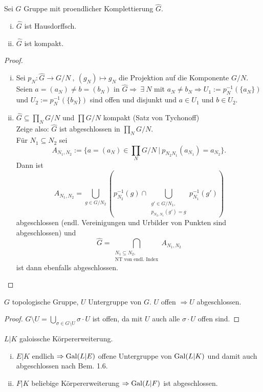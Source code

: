 \begin{Prop}
Sei $G$ Gruppe mit proendlicher Komplettierung $\hat{G}$.
\begin{enumerate}[(i)]
\item $\hat{G}$ ist Hausdorffsch.
\item $\hat{G}$ ist kompakt.
\end{enumerate}
\end{Prop}

\begin{proof}
\begin{enumerate}[i)]
\item Sei $p_N : \hat{G} \to G/N \ , \ (g_N) \mapsto g_N$ die Projektion auf die Komponente $G/N$.\\
Seien $a=(a_N) \neq b = (b_N)$ in $\hat{G} \Rightarrow \ \exists \ N$ mit $a_N \neq b_N \Rightarrow U_1:= p_N^{-1}(\{a_N\})$ und $U_2:=p_N^{-1}(\{b_N\})$ sind offen und disjunkt und $a \in U_1$ und $b \in U_2$.
\item $\hat{G} \subseteq \prod_N G/N$ und $\prod G/N$ kompakt (Satz von Tychonoff)\\
Zeige also: $\hat{G}$ ist abgeschlossen in $\prod_N G/N$.\\
Für $N_1 \subseteq N_2$ sei
\[A_{N_1, N_2} :=\{a=(a_N) \in \prod_N G/N \ | \ p_{N_2 N_1}(a_{N_1})=a_{N_2}\}.\]
Dann ist 
\[A_{N_1, N_2} = \bigcup \limits_{g \in G/N_2} (p_{N_2}^{-1}(g) \cap \bigcup \limits_{\substack{g' \in G/N_1,\\ p_{N_2, N_1}(g')=g}} p^{-1}_{N_1}(g'))\]
abgeschlossen (endl. Vereinigungen und Urbilder von Punkten sind abgeschlossen) und
\[\hat{G} = \bigcap \limits_{\substack{N_1 \subseteq N_2 ,\\ \text{NT von endl. Index}}} A_{N_1, N_2}\]
ist dann ebenfalls abgeschlossen.
\end{enumerate}
\end{proof}

\begin{Bem}
$G$ topologische Gruppe, $U$ Untergruppe von $G$. $U$ offen $\Rightarrow U$ abgeschlossen.
\end{Bem}

\begin{proof}
$G \setminus U = \bigcup_{\sigma \in G \setminus U} \sigma \cdot U$ ist offen, da mit $U$ auch alle $\sigma \cdot U$ offen sind.
\end{proof}

\begin{Prop}
$L|K$ galoissche Körpererweiterung.
\begin{enumerate}[i)]
\item $E|K$ endlich $\Rightarrow \operatorname{Gal}(L|E)$ offene Untergruppe von $\operatorname{Gal}(L|K)$ und damit auch abgeschlossen nach Bem. 1.6.
\item $F|K$ beliebige Körpererweiterung $\Rightarrow \operatorname{Gal}(L|F)$ ist abgeschlossen.
\end{enumerate}
\end{Prop}

